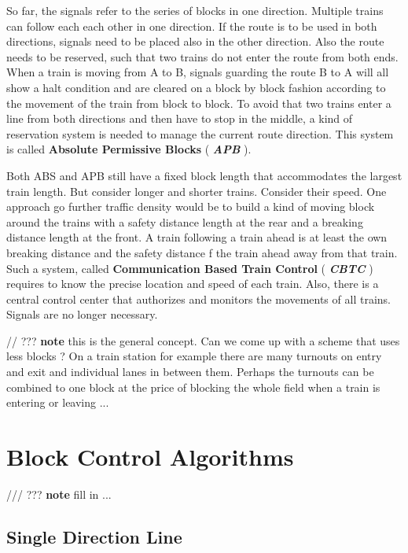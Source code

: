 
So far, the signals refer to the series of blocks in one direction. Multiple trains can follow each each other in one direction. If the route is to be used in both directions, signals need to be placed also in the other direction. Also the route needs to be reserved, such that two trains do not enter the route from both ends. When a train is moving from A to B, signals guarding the route B to A will all show a halt condition and are cleared on a block by block fashion according to the movement of the train from block to block. To avoid that two trains enter a line from both directions and then have to stop in the middle, a kind of reservation system is needed to manage the current route direction. This system is called \textbf{Absolute Permissive Blocks} ( \textbf{\textit{APB}} ).

Both ABS and APB still have a fixed block length that accommodates the largest train length. But consider longer and shorter trains. Consider their speed. One approach go further traffic density would be to build a kind of moving block around the trains with a safety distance length at the rear and a breaking distance length at the front. A train following a train ahead is at least the own breaking distance and the safety distance f the train ahead away from that train. Such a system, called \textbf{Communication Based Train Control} ( \textbf{\textit{CBTC}} ) requires to know the precise location and speed of each train. Also, there is a central control center that authorizes and monitors the movements of all trains. Signals are no longer necessary.

// ??? \textbf{note} this is the general concept. Can we come up with a scheme that uses less blocks ? On a train station for example there are many turnouts on entry and exit and individual lanes in between them. Perhaps the turnouts can be combined to one block at the price of blocking the whole field when a train is entering or leaving ...

\section{Block Control Algorithms}

/// ??? \textbf{note} fill in ...

\subsection{Single Direction Line}

